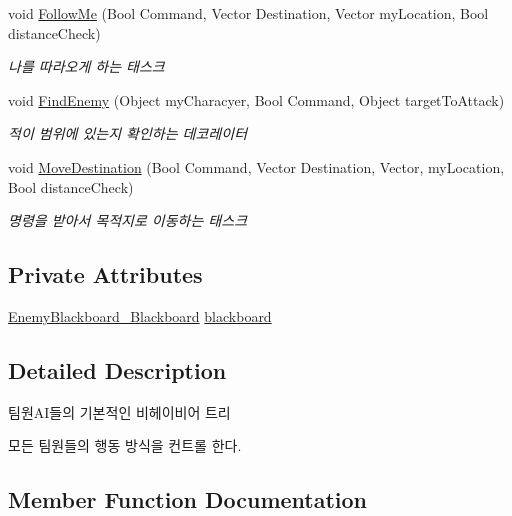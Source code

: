\begin{DoxyCompactItemize}
void \hyperlink{class_b_t___base_a802b9e457808b511a6bc5ea63abd3b87}{Follow\+Me} (Bool Command, Vector Destination, Vector my\+Location, Bool distance\+Check)
\begin{DoxyCompactList}\small\item\em 나를 따라오게 하는 태스크 \end{DoxyCompactList}\item 
void \hyperlink{class_b_t___base_aae303238f1a4876a0dc077a91c25b57f}{Find\+Enemy} (Object my\+Characyer, Bool Command, Object target\+To\+Attack)
\begin{DoxyCompactList}\small\item\em 적이 범위에 있는지 확인하는 데코레이터 \end{DoxyCompactList}\item 
void \hyperlink{class_b_t___base_a589c2fe0cc37e24c84ea3ed57157dc60}{Move\+Destination} (Bool Command, Vector Destination, Vector, my\+Location, Bool distance\+Check)
\begin{DoxyCompactList}\small\item\em 명령을 받아서 목적지로 이동하는 태스크 \end{DoxyCompactList}\end{DoxyCompactItemize}
\subsection*{Private Attributes}
\begin{DoxyCompactItemize}
\item 
\hyperlink{class_enemy_blackboard___blackboard}{Enemy\+Blackboard\+\_\+\+Blackboard} \hyperlink{class_b_t___base_a8a095b67df2778f5155d24dad9f818ef}{blackboard}
\end{DoxyCompactItemize}


\subsection{Detailed Description}
팀원\+A\+I들의 기본적인 비헤이비어 트리 

모든 팀원들의 행동 방식을 컨트롤 한다. 

\subsection{Member Function Documentation}
